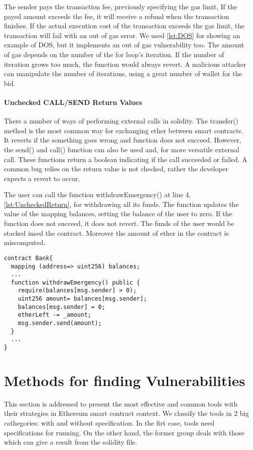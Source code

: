 \documentclass[a4paper,sigconf, language=french,
language=german, language=spanish, language=english]{acmart}
\begin{document}
The sender pays the transaction fee, previously specifying the gas limit, If the payed amount exceeds the fee, it will receive a refund when the transaction finishes. 
If the actual execution cost of the transaction exceeds the gas limit, the transaction will fail with an out of gas error. 
We used \autoref{lst:DOS} for showing an example of DOS, but it implements an out of gas vulnerability too. 
The amount of gas depends on the number of the for loop's iteration. If the number of iteration grows too much, the function would always revert. A malicious attacker can 
manipulate the number of iterations, using a great number of wallet for the bid.

\paragraph{Unchecked CALL/SEND Return Values} There a number of ways of performing external calls in solidity. The transfer() method is the most common way for exchanging ether between smart contracts. 
It reverts if the something goes wrong and function does not succeed. However, the send() and call() function can also be used and, for more versatile external call. 
These functions return a boolean indicating if the call succeeded or failed.  A common bug relies on the return value is not checked, rather the developer expects a revert to occur. 

The user can call the function withdrawEmergency()  at line 4, \autoref{lst:UncheckedReturn}, for withdrawing all its funds. The function updates the value of the mapping balances, setting 
the balance of the user to zero. If the function does not succeed, it does not revert. 
The funds of the user would be stacked insed the contract. Moreover the amount of ether in the contract is miscomputed.


\begin{lstlisting}[language=Solidity,caption={Unchecked CALL/SEND Return Values},label={lst:UncheckedReturn}]
contract Bank{
  mapping (address=> uint256) balances;
  ... 
  function withdrawEmergency() public {
    require(balances[msg.sender] > 0);
    uint256 amount= balances[msg.sender];
    balances[msg.sender] = 0;
    etherLeft -= _amount;
    msg.sender.send(amount);
  }
  ...
}

\end{lstlisting}

\section{Methods for finding Vulnerabilities}
\label{MethodologiesForTools}
This section is addressed to present the most effective and common tools with their strategies in Ethereum smart contract context. 
We classify the tools in 2 big cathegories: with and without specification. 
In the firt case, tools need specifications for running. On the other hand,  the former group 
deals with those which can give a result from the solidity file.
\end{document}
